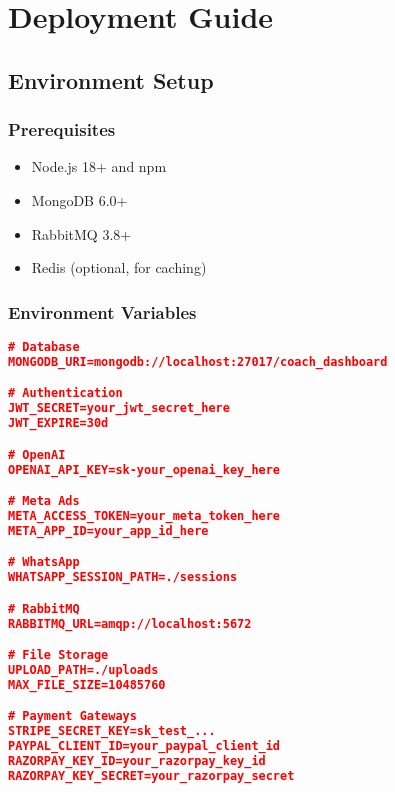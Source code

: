 \documentclass[12pt,a4paper]{article}
\newcommand{\samplecode}[1]{\begin{lstlisting}[language=JSON]#1\end{lstlisting}}
\begin{document}
\section{Deployment Guide}

\subsection{Environment Setup}

\subsubsection{Prerequisites}
\begin{itemize}
    \item Node.js 18+ and npm
    \item MongoDB 6.0+
    \item RabbitMQ 3.8+
    \item Redis (optional, for caching)
\end{itemize}

\subsubsection{Environment Variables}
\samplecode{
# Database
MONGODB_URI=mongodb://localhost:27017/coach_dashboard

# Authentication
JWT_SECRET=your_jwt_secret_here
JWT_EXPIRE=30d

# OpenAI
OPENAI_API_KEY=sk-your_openai_key_here

# Meta Ads
META_ACCESS_TOKEN=your_meta_token_here
META_APP_ID=your_app_id_here

# WhatsApp
WHATSAPP_SESSION_PATH=./sessions

# RabbitMQ
RABBITMQ_URL=amqp://localhost:5672

# File Storage
UPLOAD_PATH=./uploads
MAX_FILE_SIZE=10485760

# Payment Gateways
STRIPE_SECRET_KEY=sk_test_...
PAYPAL_CLIENT_ID=your_paypal_client_id
RAZORPAY_KEY_ID=your_razorpay_key_id
RAZORPAY_KEY_SECRET=your_razorpay_secret
}
\end{document}
